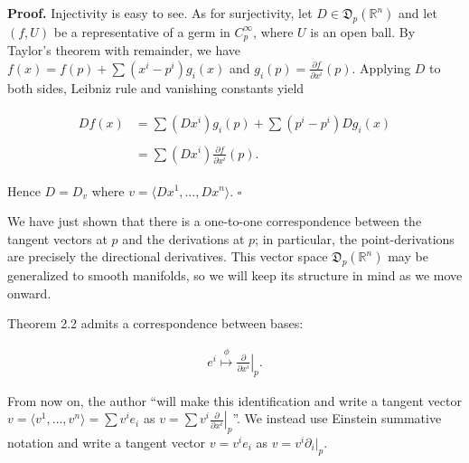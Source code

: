\documentclass[a4paper]{article}
\newcommand{\R}{\mathbb{R}}
\begin{document}
\textbf{Proof.} Injectivity is easy to see. As for surjectivity, let $D \in \mathfrak{D}_p(\R^n)$ and let $(f, U)$ be a representative of a germ in $C_p^\infty$, where $U$ is an open ball. By Taylor's theorem with remainder, we have $f(x) = f(p) + \sum (x^i - p^i)g_i(x)$ and $g_i(p) = \frac{\partial f}{\partial x^i}(p)$. Applying $D$ to both sides, Leibniz rule and vanishing constants yield

\begin{align}
\begin{split}
    Df(x) &= \sum (Dx^i)g_i(p) + \sum (p^i - p^i) Dg_i(x) \\ \ \\
    &= \sum (Dx^i) \frac{\partial f}{\partial x^i}(p).
\end{split}
\end{align}

Hence $D = D_v$ where $v = \langle Dx^1, \ldots, Dx^n \rangle$. $\square$

We have just shown that there is a one-to-one correspondence between the tangent vectors at $p$ and the derivations at $p$; in particular, the point-derivations are precisely the directional derivatives. This vector space $\mathfrak{D}_p(\R^n)$ may be generalized to smooth manifolds, so we will keep its structure in mind as we move onward.

Theorem 2.2 admits a correspondence between bases:

\begin{align}
    e^i \overset{\phi}{\longmapsto} \left.\frac{\partial}{\partial x^i}\right|_p.
\end{align}

From now on, the author ``will make this identification and write a tangent vector $v = \langle v^1, \ldots, v^n \rangle = \sum v^ie_i$ as $v = \sum v^i \left.\frac{\partial}{\partial x^i}\right|_p$''. We instead use Einstein summative notation and write a tangent vector $v = v^ie_i$ as $v = v^i \partial_i|_p$.
\end{document}
